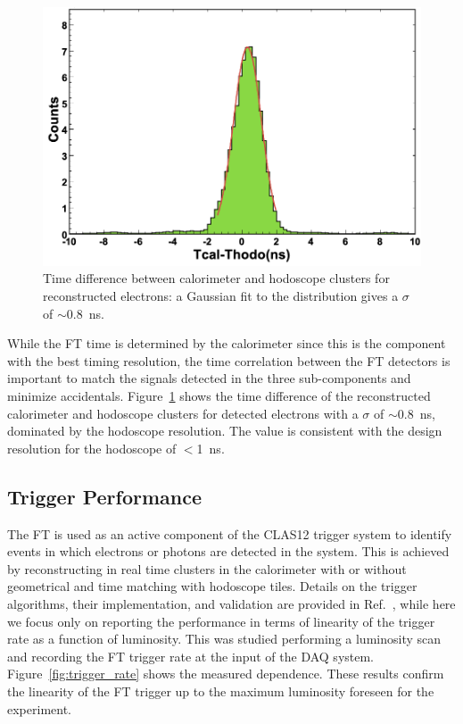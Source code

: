\begin{figure}[h]
\includegraphics[height=0.6\columnwidth]{fig/ftcalhodo_time.png}
\caption{Time difference between calorimeter and hodoscope clusters for reconstructed electrons: a Gaussian fit
  to the distribution gives a $\sigma$ of $\sim$0.8~ns.}
\label{fig:ftcalhodo_time}
\end{figure}

While the FT time is determined by the calorimeter since this is the component with the best timing resolution,
the time correlation between the FT detectors is important to match the signals detected in the three
sub-components and minimize accidentals. Figure~\ref{fig:ftcalhodo_time} shows the time difference of the
reconstructed calorimeter and hodoscope clusters for detected electrons with a $\sigma$ of $\sim$0.8~ns,
dominated by the hodoscope resolution. The value is consistent with the design resolution for the hodoscope of
$<$1~ns.

\subsection{Trigger Performance}

The FT is used as an active component of the CLAS12 trigger system to identify events in which electrons or
photons are detected in the system. This is achieved by reconstructing in real time clusters in the calorimeter with
or without geometrical and time matching with hodoscope tiles. Details on the trigger algorithms, their implementation,
and validation are provided in Ref.~\cite{trigger}, while here we focus only on reporting the performance in terms of
linearity of the trigger rate as a function of luminosity. This was studied performing a luminosity scan and recording
the FT trigger rate at the input of the DAQ system. Figure~\ref{fig:trigger_rate} shows the measured dependence.
These results confirm the linearity of the FT trigger up to the maximum luminosity foreseen for the experiment.

